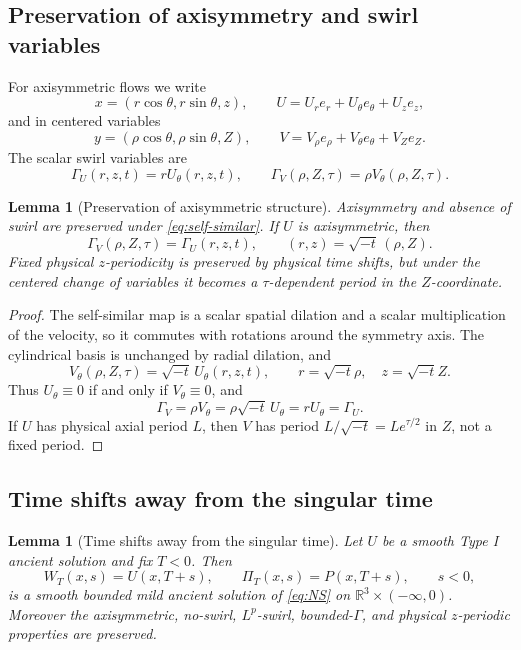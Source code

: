 \documentclass[11pt]{amsart}
\theoremstyle{plain}
\newtheorem{lemma}[theorem]{Lemma}
\theoremstyle{definition}
\theoremstyle{remark}
\numberwithin{equation}{section}
\begin{document}
\subsection{Preservation of axisymmetry and swirl variables}

For axisymmetric flows we write
\[
   x=(r\cos\theta,r\sin\theta,z),\qquad
   U=U_re_r+U_\theta e_\theta+U_ze_z,
\]
and in centered variables
\[
   y=(\rho\cos\theta,\rho\sin\theta,Z),\qquad
   V=V_\rho e_\rho+V_\theta e_\theta+V_Ze_Z.
\]
The scalar swirl variables are
\[
   \Gamma_U(r,z,t)=rU_\theta(r,z,t),\qquad
   \Gamma_V(\rho,Z,\tau)=\rho V_\theta(\rho,Z,\tau).
\]

\begin{lemma}[Preservation of axisymmetric structure]
\label{lem:structure-preserved}
Axisymmetry and absence of swirl are preserved under
\eqref{eq:self-similar}.  If \(U\) is axisymmetric, then
\[
   \Gamma_V(\rho,Z,\tau)=\Gamma_U(r,z,t),
   \qquad
   (r,z)=\sqrt{-t}\,(\rho,Z).
\]
Fixed physical \(z\)-periodicity is preserved by physical time shifts, but
under the centered change of variables it becomes a \(\tau\)-dependent period
in the \(Z\)-coordinate.
\end{lemma}

\begin{proof}
The self-similar map is a scalar spatial dilation and a scalar multiplication
of the velocity, so it commutes with rotations around the symmetry axis.
The cylindrical basis is unchanged by radial dilation, and
\[
   V_\theta(\rho,Z,\tau)
   =
   \sqrt{-t}\,U_\theta(r,z,t),
   \qquad
   r=\sqrt{-t}\rho,\quad z=\sqrt{-t}Z .
\]
Thus \(U_\theta\equiv0\) if and only if \(V_\theta\equiv0\), and
\[
   \Gamma_V=\rho V_\theta
   =
   \rho\sqrt{-t}\,U_\theta
   =
   rU_\theta
   =
   \Gamma_U .
\]
If \(U\) has physical axial period \(L\), then \(V\) has period
\(L/\sqrt{-t}=Le^{\tau/2}\) in \(Z\), not a fixed period.
\end{proof}

\subsection{Time shifts away from the singular time}

\begin{lemma}[Time shifts away from the singular time]
\label{lem:time-shift}
Let \(U\) be a smooth Type I ancient solution and fix \(T<0\).  Then
\[
   W_T(x,s)=U(x,T+s),\qquad \Pi_T(x,s)=P(x,T+s),\qquad s<0,
\]
is a smooth bounded mild ancient solution of \eqref{eq:NS} on
\(\mathbb R^3\times(-\infty,0)\).  Moreover the axisymmetric, no-swirl,
\(L^p\)-swirl, bounded-\(\Gamma\), and physical \(z\)-periodic properties are
preserved.
\end{lemma}
\end{document}
